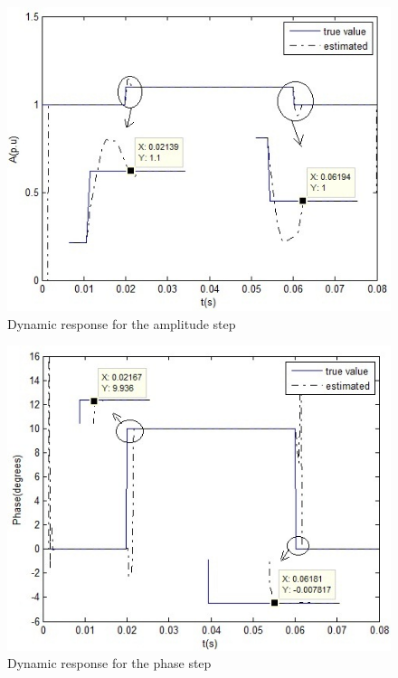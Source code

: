 \documentclass{UCF_ETD}
\begin{document}
\begin{figure}[H]
\begin{center}
\includegraphics[scale=0.74]{BLMS_Figures/DynamicResAmpStep}
\caption{Dynamic response for the amplitude step}
\label{DynamicResAmpStep}
\end{center}
\end{figure}

\begin{figure}[H]
\begin{center}
\includegraphics[scale=0.74]{BLMS_Figures/DynamicResPhaseStep}
\caption{Dynamic response for the phase step}
\label{DynamicResPhaseStep}
\end{center}
\end{figure}
\end{document}
